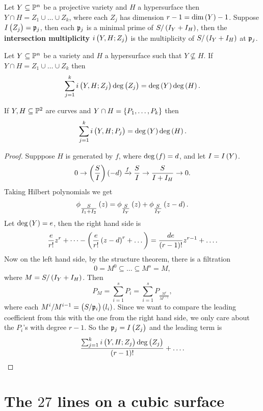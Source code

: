 \pagebreak


Let $ Y \subseteq \P^n $ be a projective variety and $ H $ a hypersurface then $ Y \cap H = Z_1 \cup \dots \cup Z_k $, where each $ Z_j $ has dimension $ r - 1 = \dim\br{Y} - 1 $. Suppose $ I\br{Z_j} = \pp_j $, then each $ \pp_j $ is a minimal prime of $ S / \br{I_Y + I_H} $, then the \textbf{intersection multiplicity} $ i\br{Y, H; Z_j} $ is the multiplicity of $ S / \br{I_Y + I_H} $ at $ \pp_j $.

\begin{theorem}
Let $ Y \subseteq \P^n $ be a variety and $ H $ a hypersurface such that $ Y \nsubseteq H $. If $ Y \cap H = Z_1 \cup \dots \cup Z_k $ then
$$ \sum_{j = 1}^k i\br{Y, H; Z_j}\deg\br{Z_j} = \deg\br{Y}\deg\br{H}. $$
\end{theorem}

\begin{corollary}
If $ Y, H \subseteq \P^2 $ are curves and $ Y \cap H = \cbr{P_1, \dots, P_k} $ then
$$ \sum_{j = 1}^k i\br{Y, H; P_j} = \deg\br{Y}\deg\br{H}. $$
\end{corollary}

\begin{proof}
Supppose $ H $ is generated by $ f $, where $ \deg\br{f} = d $, and let $ I = I\br{Y} $.
$$ 0 \to \br{\dfrac{S}{I}}\br{-d} \xrightarrow{f} \dfrac{S}{I} \to \dfrac{S}{I + I_H} \to 0. $$
Taking Hilbert polynomials we get
$$ \phi_{\tfrac{S}{I_1 + I_2}}\br{z} = \phi_{\tfrac{S}{I_Y}}\br{z} + \phi_{\tfrac{S}{I_Y}}\br{z - d}. $$
Let $ \deg\br{Y} = e $, then the right hand side is
$$ \dfrac{e}{r!}z^r + \dots - \br{\dfrac{e}{r!}\br{z - d}^r + \dots} = \dfrac{de}{\br{r - 1}!}z^{r - 1} + \dots. $$
Now on the left hand side, by the structure theorem, there is a filtration
$$ 0 = M^0 \subseteq \dots \subseteq M^s = M, $$
where $ M = S / \br{I_Y + I_H} $. Then
$$ P_M = \sum_{i = 1}^s P_i = \sum_{i = 1}^s P_{\tfrac{M^i}{M^{i - 1}}}, $$
where each $ M^i / M^{i - 1} = \br{S / \pp_i}\br{l_i} $. Since we want to compare the leading coefficient from this with the one from the right hand side, we only care about the $ P_i $'s with degree $ r - 1 $. So the $ \pp_j = I\br{Z_j} $ and the leading term is
$$ \dfrac{\sum_{j = 1}^k i\br{Y, H; Z_j}\deg\br{Z_j}}{\br{r - 1}!} + \dots. $$
\end{proof}

\pagebreak

\section{The \texorpdfstring{$ 27 $}{27} lines on a cubic surface}

